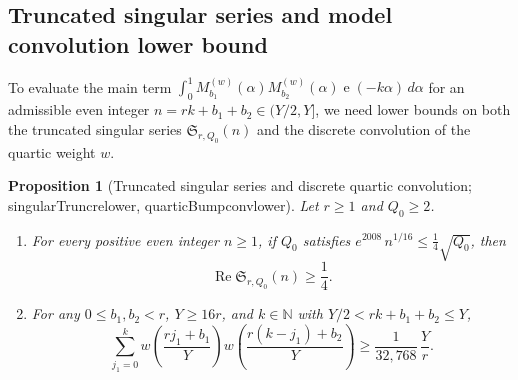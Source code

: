\documentclass[11pt,reqno]{amsart}
\numberwithin{equation}{section}
\newtheorem{proposition}[theorem]{Proposition}
\theoremstyle{definition}
\newcommand{\N}{\mathbb{N}}
\newcommand{\1}{\mathbf{1}}
\newcommand{\e}{\operatorname{e}}
\newcommand{\Sing}{\mathfrak{S}}
\renewcommand{\Re}{\operatorname{Re}}
\newcommand{\lean}[1]{{\footnotesize\ttfamily\renewcommand{\_}{\textunderscore\allowbreak}#1}}
\begin{document}
\subsection{Truncated singular series and model convolution lower bound}

To evaluate the main term $\int_0^1 M_{b_1}^{(w)}(\alpha) M_{b_2}^{(w)}(\alpha) \e(-k\alpha)\,d\alpha$ for an admissible even integer $n = r k + b_1 + b_2 \in (Y/2, Y]$, we need lower bounds on both the truncated singular series $\Sing_{r, Q_0}(n)$ and the discrete convolution of the quartic weight $w$.

\begin{proposition}[Truncated singular series and discrete quartic convolution; \lean{singularTrunc\_re\_lower}, \lean{quarticBump\_conv\_lower}]
\label{prop:sing-conv}
Let $r \ge 1$ and $Q_0 \ge 2$.
\begin{enumerate}[label=(\alph*)]
  \item For every positive even integer $n \ge 1$, if $Q_0$ satisfies $e^{2008}\, n^{1/16} \le \frac{1}{4}\sqrt{Q_0}$, then
  \begin{equation}\label{eq:sing-lower}
    \Re \Sing_{r, Q_0}(n) \ge \frac{1}{4}.
  \end{equation}
  \item For any $0 \le b_1, b_2 < r$, $Y \ge 16 r$, and $k \in \N$ with $Y/2 < r k + b_1 + b_2 \le Y$,
  \begin{equation}\label{eq:w-conv-lower}
    \sum_{j_1 = 0}^{k} w\!\left(\frac{r j_1 + b_1}{Y}\right) w\!\left(\frac{r (k - j_1) + b_2}{Y}\right)
    \ge \frac{1}{32{,}768}\,\frac{Y}{r}.
  \end{equation}
\end{enumerate}
\end{proposition}
\end{document}
